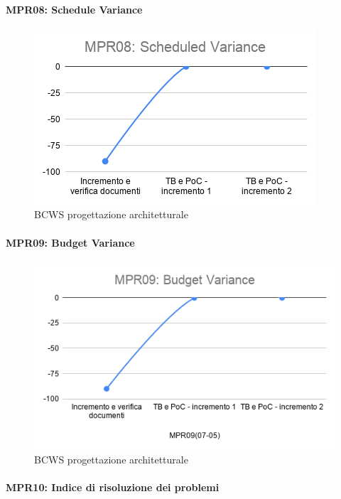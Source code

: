 \paragraph*{MPR08: Schedule Variance}
\begin{figure}[ht]
 	\centering
 	\includegraphics[scale=0.6]{Immagini/SV_PArchitetturale.png}
 	\caption{BCWS progettazione architetturale}
 	\label{fig:SV_PArchitetturale}
\end{figure}
\paragraph*{MPR09: Budget Variance}
\begin{figure}[ht]
	\centering
	\includegraphics[scale=0.6]{Immagini/BV_PArchitetturale.png}
	\caption{BCWS progettazione architetturale}
	\label{fig:BV_PArchitetturale}
\end{figure}
\paragraph*{MPR10: Indice di risoluzione dei problemi}